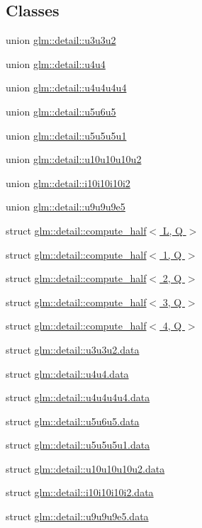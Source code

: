 \subsection*{Classes}
\begin{DoxyCompactItemize}
\item 
union \hyperlink{unionglm_1_1detail_1_1u3u3u2}{glm\+::detail\+::u3u3u2}
\item 
union \hyperlink{unionglm_1_1detail_1_1u4u4}{glm\+::detail\+::u4u4}
\item 
union \hyperlink{unionglm_1_1detail_1_1u4u4u4u4}{glm\+::detail\+::u4u4u4u4}
\item 
union \hyperlink{unionglm_1_1detail_1_1u5u6u5}{glm\+::detail\+::u5u6u5}
\item 
union \hyperlink{unionglm_1_1detail_1_1u5u5u5u1}{glm\+::detail\+::u5u5u5u1}
\item 
union \hyperlink{unionglm_1_1detail_1_1u10u10u10u2}{glm\+::detail\+::u10u10u10u2}
\item 
union \hyperlink{unionglm_1_1detail_1_1i10i10i10i2}{glm\+::detail\+::i10i10i10i2}
\item 
union \hyperlink{unionglm_1_1detail_1_1u9u9u9e5}{glm\+::detail\+::u9u9u9e5}
\item 
struct \hyperlink{structglm_1_1detail_1_1compute__half}{glm\+::detail\+::compute\+\_\+half$<$ L, Q $>$}
\item 
struct \hyperlink{structglm_1_1detail_1_1compute__half_3_011_00_01Q_01_4}{glm\+::detail\+::compute\+\_\+half$<$ 1, Q $>$}
\item 
struct \hyperlink{structglm_1_1detail_1_1compute__half_3_012_00_01Q_01_4}{glm\+::detail\+::compute\+\_\+half$<$ 2, Q $>$}
\item 
struct \hyperlink{structglm_1_1detail_1_1compute__half_3_013_00_01Q_01_4}{glm\+::detail\+::compute\+\_\+half$<$ 3, Q $>$}
\item 
struct \hyperlink{structglm_1_1detail_1_1compute__half_3_014_00_01Q_01_4}{glm\+::detail\+::compute\+\_\+half$<$ 4, Q $>$}
\item 
struct \hyperlink{structglm_1_1detail_1_1u3u3u2_8data}{glm\+::detail\+::u3u3u2.\+data}
\item 
struct \hyperlink{structglm_1_1detail_1_1u4u4_8data}{glm\+::detail\+::u4u4.\+data}
\item 
struct \hyperlink{structglm_1_1detail_1_1u4u4u4u4_8data}{glm\+::detail\+::u4u4u4u4.\+data}
\item 
struct \hyperlink{structglm_1_1detail_1_1u5u6u5_8data}{glm\+::detail\+::u5u6u5.\+data}
\item 
struct \hyperlink{structglm_1_1detail_1_1u5u5u5u1_8data}{glm\+::detail\+::u5u5u5u1.\+data}
\item 
struct \hyperlink{structglm_1_1detail_1_1u10u10u10u2_8data}{glm\+::detail\+::u10u10u10u2.\+data}
\item 
struct \hyperlink{structglm_1_1detail_1_1i10i10i10i2_8data}{glm\+::detail\+::i10i10i10i2.\+data}
\item 
struct \hyperlink{structglm_1_1detail_1_1u9u9u9e5_8data}{glm\+::detail\+::u9u9u9e5.\+data}
\end{DoxyCompactItemize}
